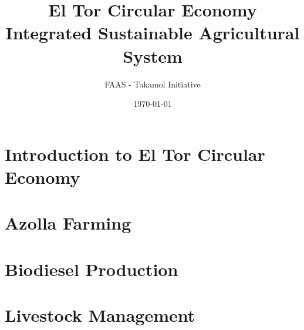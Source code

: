 \documentclass[12pt,a4paper]{report}
\title{El Tor Circular Economy\\
\large Integrated Sustainable Agricultural System}
\author{FAAS - Takamol Initiative}
\date{\today}
\begin{document}
\maketitle
\tableofcontents

\chapter{Introduction to El Tor Circular Economy}


\chapter{Azolla Farming}









\chapter{Biodiesel Production}









\chapter{Livestock Management}








\end{document}
